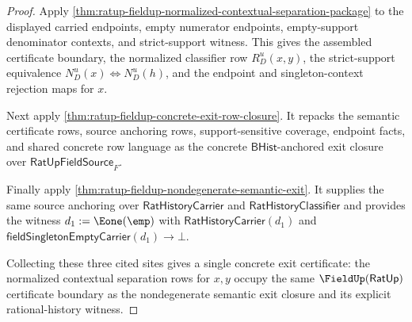 \begin{proof}
Apply
\autoref{thm:ratup-fieldup-normalized-contextual-separation-package} to the
displayed carried endpoints, empty numerator endpoints, empty-support
denominator contexts, and strict-support witness. This gives the assembled
certificate boundary, the normalized classifier row $R_D^u(x,y)$, the
strict-support equivalence $N_D^u(x)\Longleftrightarrow N_D^u(h)$, and the
endpoint and singleton-context rejection maps for $x$.

Next apply \autoref{thm:ratup-fieldup-concrete-exit-row-closure}. It repacks
the semantic certificate rows, source anchoring rows, support-sensitive
coverage, endpoint facts, and shared concrete row language as the concrete
$\mathsf{BHist}$-anchored exit closure over $\mathsf{RatUpFieldSource}_F$.

Finally apply \autoref{thm:ratup-fieldup-nondegenerate-semantic-exit}. It
supplies the same source anchoring over $\mathsf{RatHistoryCarrier}$ and
$\mathsf{RatHistoryClassifier}$ and provides the witness
$d_1:=\Eone(\emp)$ with $\mathsf{RatHistoryCarrier}(d_1)$ and
$\mathsf{fieldSingletonEmptyCarrier}(d_1)\to\bot$.

Collecting these three cited sites gives a single concrete exit certificate:
the normalized contextual separation rows for $x,y$ occupy the same
$\FieldUp(\mathsf{RatUp})$ certificate boundary as the nondegenerate semantic
exit closure and its explicit rational-history witness.
\end{proof}
